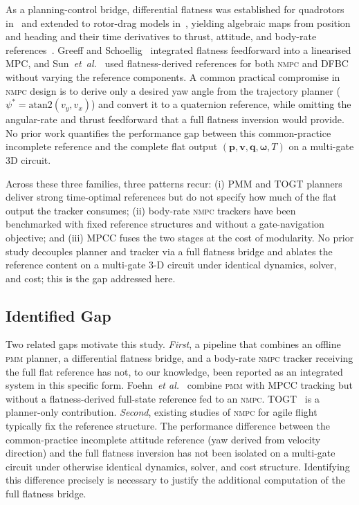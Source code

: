 \documentclass{ieeeaccess}
\newcommand{\vect}[1]{\bm{#1}}
\newcommand{\pmm}{\textsc{pmm}}
\newcommand{\nmpc}{\textsc{nmpc}}
\begin{document}
As a planning-control bridge, differential flatness was established for
quadrotors in~\cite{mellinger2011minimum} and extended to rotor-drag
models in~\cite{faessler2018differential}, yielding algebraic maps from
position and heading and their time derivatives to thrust, attitude,
and body-rate references~\cite{faessler2017thrust}.
Greeff and Schoellig~\cite{greeff2018flatness} integrated flatness
feedforward into a linearised MPC, and
Sun~\textit{et~al.}~\cite{sun2022comparative} used flatness-derived
references for both \nmpc{} and DFBC without varying the reference
components.
A common practical compromise in \nmpc{} design is to derive only a
desired yaw angle from the trajectory planner
($\psi^*=\mathrm{atan2}(v_y,v_x)$) and convert it to a quaternion
reference, while omitting the angular-rate and thrust feedforward that
a full flatness inversion would provide.
No prior work quantifies the performance gap between this common-practice
incomplete reference and the complete flat output
$(\vect{p},\vect{v},\vect{q},\vect{\omega},T)$ on a multi-gate 3D
circuit.

Across these three families, three patterns recur: (i) PMM and TOGT
planners deliver strong time-optimal references but do not specify
how much of the flat output the tracker consumes; (ii) body-rate
\nmpc{} trackers have been benchmarked with fixed reference structures
and without a gate-navigation objective; and (iii) MPCC fuses the two
stages at the cost of modularity.
No prior study decouples planner and tracker via a full flatness
bridge and ablates the reference content on a multi-gate 3-D circuit
under identical dynamics, solver, and cost; this is the gap addressed
here.

\subsection{Identified Gap}
\label{subsec:gap}

Two related gaps motivate this study.
\emph{First}, a pipeline that combines an offline \pmm{} planner, a
differential flatness bridge, and a body-rate \nmpc{} tracker receiving
the full flat reference has not, to our knowledge, been reported as an
integrated system in this specific form.
Foehn~\textit{et al.}~\cite{foehn2021time} combine \pmm{} with \mbox{MPCC}
tracking but without a flatness-derived full-state reference fed to an
\nmpc{}.
\mbox{TOGT}~\cite{qin2024togt} is a planner-only contribution.
\emph{Second}, existing studies of \nmpc{} for agile flight typically fix
the reference structure.
The performance difference between the common-practice incomplete attitude
reference (yaw derived from velocity direction) and the full flatness
inversion has not been isolated on a multi-gate circuit under otherwise
identical dynamics, solver, and cost structure.
Identifying this difference precisely is necessary to justify the
additional computation of the full flatness bridge.
\end{document}
